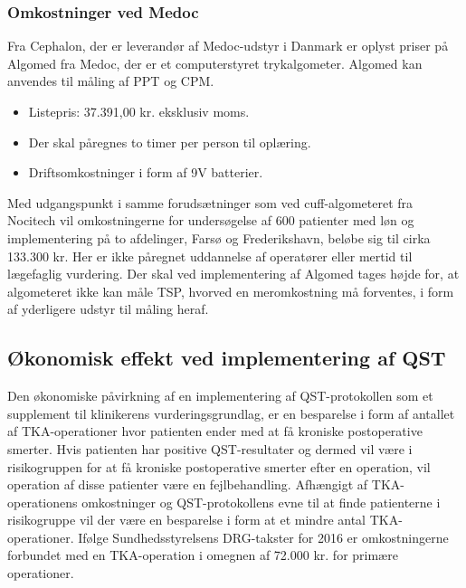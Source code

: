\subsubsection{Omkostninger ved Medoc}
Fra Cephalon, der er leverandør af Medoc-udstyr i Danmark er oplyst priser på Algomed fra Medoc, der er et computerstyret trykalgometer. Algomed kan anvendes til måling af PPT og CPM. \citep{AlgomedData} \citep{AlgomedOnline}

\begin{itemize} 
\item Listepris: 37.391,00 kr. eksklusiv moms.
\item Der skal påregnes to timer per person til oplæring.
\item Driftsomkostninger i form af 9V batterier.
\end{itemize}

Med udgangspunkt i samme forudsætninger som ved cuff-algometeret fra Nocitech vil omkostningerne for undersøgelse af 600 patienter med løn og implementering på to afdelinger, Farsø og Frederikshavn, beløbe sig til cirka 133.300 kr. Her er ikke påregnet uddannelse af operatører eller mertid til lægefaglig vurdering. Der skal ved implementering af Algomed tages højde for, at algometeret ikke kan måle TSP, hvorved en meromkostning må forventes, i form af yderligere udstyr til måling heraf.

\subsection{Økonomisk effekt ved implementering af QST}
Den økonomiske påvirkning af en implementering af QST-protokollen som et supplement til klinikerens vurderingsgrundlag, er en besparelse i form af antallet af TKA-operationer hvor patienten ender med at få kroniske postoperative smerter. Hvis patienten har positive QST-resultater og dermed vil være i risikogruppen for at få kroniske postoperative smerter efter en operation, vil operation af disse patienter være en fejlbehandling. Afhængigt af TKA-operationens omkostninger og QST-protokollens evne til at finde patienterne i risikogruppe vil der være en besparelse i form at et mindre antal TKA-operationer. Ifølge Sundhedsstyrelsens DRG-takster for 2016 er omkostningerne forbundet med en TKA-operation i omegnen af 72.000 kr. for primære operationer. \citep{Takst2016}

